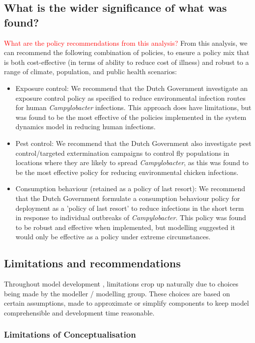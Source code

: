 \subsection{What is the wider significance of what was found?}
\textcolor{red}{What are the policy recommendations from this analysis?}
From this analysis, we can recommend the following combination of policies, to ensure a policy mix that is both cost-effective (in terms of ability to reduce cost of illness) and robust to a range of climate, population, and public health scenarios:
\begin{itemize}
    \item Exposure control: We recommend that the Dutch Government investigate an exposure control policy as specified to reduce environmental infection routes for human \textit{Campylobacter} infections. This approach does have limitations, but was found to be the most effective of the policies implemented in the system dynamics model in reducing human infections.
    \item Pest control: We recommend that the Dutch Government also investigate pest control/targeted extermination campaigns to control fly populations in locations where they are likely to spread \textit{Campylobacter}, as this was found to be the most effective policy for reducing environmental chicken infections.
    \item Consumption behaviour (retained as a policy of last resort): We recommend that the Dutch Government formulate a consumption behaviour policy for deployment as a 'policy of last resort' to reduce infections in the short term in response to individual outbreaks of \textit{Campylobacter}. This policy was found to be robust and effective when implemented, but modelling suggested it would only be effective as a policy under extreme circumstances.
\end{itemize}

\subsection{Limitations and recommendations}

Throughout model development , limitations crop up naturally due to choices being made by the modeller / modelling group. These choices are based on certain assumptions, made to approximate or simplify components to keep model comprehensible and development time reasonable.

\subsubsection{Limitations of Conceptualisation}

